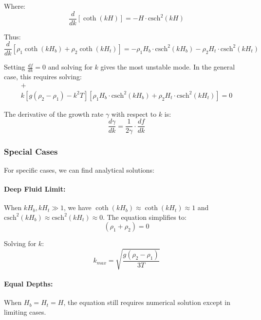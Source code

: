 \documentclass[12pt,a4paper]{article}
\begin{document}
Where:
\begin{equation}
\frac{d}{dk}[\coth(kH)] = -H \cdot \text{csch}^2(kH)
\end{equation}

Thus:
\begin{equation}
\frac{d}{dk}[\rho_1\coth(kH_b) + \rho_2\coth(kH_t)] = -\rho_1 H_b \cdot \text{csch}^2(kH_b) - \rho_2 H_t \cdot \text{csch}^2(kH_t)
\end{equation}

Setting $\frac{df}{dk} = 0$ and solving for $k$ gives the most unstable mode. In the general case, this requires solving:
\begin{multline}
[g(\rho_2 - \rho_1) - 3k^2T][\rho_1\coth(kH_b) + \rho_2\coth(kH_t)] + \\
k[g(\rho_2 - \rho_1) - k^2T][\rho_1 H_b \cdot \text{csch}^2(kH_b) + \rho_2 H_t \cdot \text{csch}^2(kH_t)] = 0
\end{multline}

The derivative of the growth rate $\gamma$ with respect to $k$ is:
\begin{equation}
\frac{d\gamma}{dk} = \frac{1}{2\gamma} \cdot \frac{df}{dk}
\end{equation}

\subsubsection{Special Cases}
For specific cases, we can find analytical solutions:

\paragraph{Deep Fluid Limit:} When $kH_b, kH_t \gg 1$, we have $\coth(kH_b) \approx \coth(kH_t) \approx 1$ and $\text{csch}^2(kH_b) \approx \text{csch}^2(kH_t) \approx 0$. The equation simplifies to:
\begin{equation}
[g(\rho_2 - \rho_1) - 3k^2T](\rho_1 + \rho_2) = 0
\end{equation}

Solving for $k$:
\begin{equation}
k_{max} = \sqrt{\frac{g(\rho_2 - \rho_1)}{3T}}
\end{equation}

\paragraph{Equal Depths:} When $H_b = H_t = H$, the equation still requires numerical solution except in limiting cases.
\end{document}
